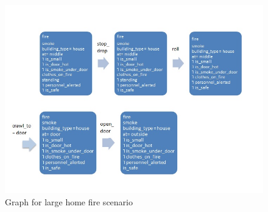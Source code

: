 \documentclass[a4paper,12pt]{report}
\begin{document}
\begin{figure}
\label{fig:graph}
\includegraphics[scale=0.8]{Graph_home_fire.jpg}
\caption{Graph for large home fire scenario}
\end{figure}
\end{document}
